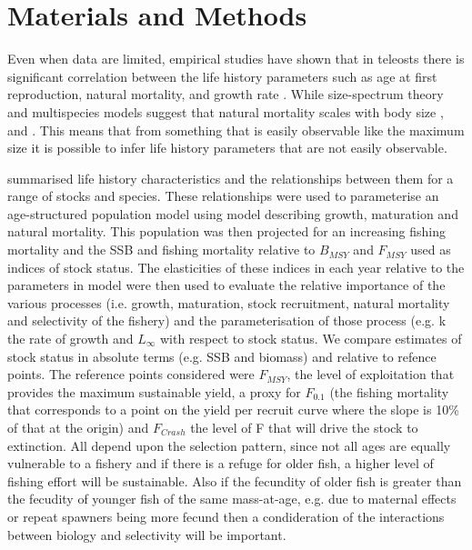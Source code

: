 \documentclass[10pt]{article}
\begin{document}
\section*{Materials and Methods}

Even when data are limited, empirical studies have shown that in teleosts there is significant correlation between the life history parameters  
such as age at first  reproduction, natural mortality, and growth rate \cite{roff1984evolution}.  While size-spectrum theory 
and multispecies models suggest that natural mortality scales with body size \cite{andersen2006asymptotic}, 
\cite{pope2006modelling} and \cite{gislason2008coexistence}. This means that from something that is easily observable like the maximum size 
it is possible to infer life history parameters that are not easily observable.

\cite{gislason2008does} summarised life history characteristics and the relationships between them for a range of stocks and species. 
These relationships were used to parameterise an age-structured population model using model describing growth, maturation and natural mortality.
This population was then projected for an increasing fishing mortality and the SSB and fishing mortality relative to $B_{MSY}$ and $F_{MSY}$
used as indices of stock status. The elasticities of these indices in each year relative to the parameters in model were then used to
evaluate the relative importance of the various processes (i.e. growth, maturation, stock recruitment, natural mortality and selectivity of the fishery)
and the parameterisation of those process (e.g. k the rate of growth and $L_{\infty}$ with respect to stock status. We compare estimates of stock status in absolute terms 
(e.g. SSB and biomass) and relative to refence points. The reference points considered were $F_{MSY}$, the level of exploitation that provides the maximum 
sustainable yield, a proxy for $F_{0.1}$ (the fishing 
mortality that corresponds to a point on the yield per recruit curve where the slope is 10\% of that at the origin) and  $F_{Crash}$ 
the level of F that will drive the stock to extinction. All depend upon the selection pattern,  
since not all ages are equally vulnerable to a fishery and if there is a refuge for older fish, a higher level of fishing effort will be sustainable.
Also if the fecundity of older fish is greater than the fecudity of younger fish of the same mass-at-age, e.g. due to maternal effects or repeat
spawners being more fecund then a condideration of the interactions between biology and selectivity will be important.
\end{document}
